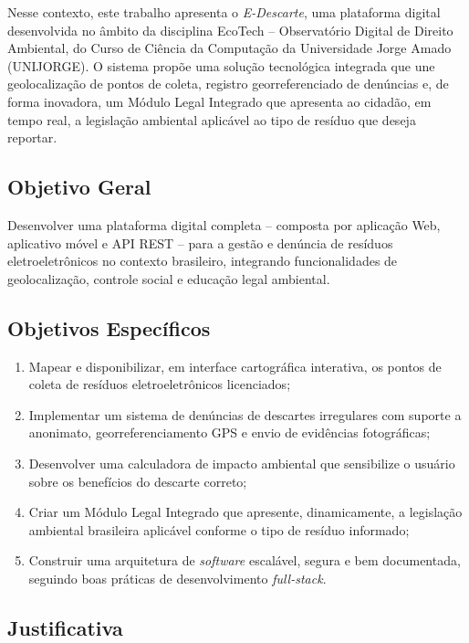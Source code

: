 \documentclass[12pt, a4paper]{article}
\numberwithin{equation}{section}
\numberwithin{figure}{section}
\numberwithin{table}{section}
\begin{document}
Nesse contexto, este trabalho apresenta o \textit{E-Descarte}, uma plataforma
digital desenvolvida no âmbito da disciplina EcoTech -- Observatório Digital de
Direito Ambiental, do Curso de Ciência da Computação da Universidade Jorge Amado
(UNIJORGE). O sistema propõe uma solução tecnológica integrada que une
geolocalização de pontos de coleta, registro georreferenciado de denúncias e,
de forma inovadora, um Módulo Legal Integrado que apresenta ao cidadão, em
tempo real, a legislação ambiental aplicável ao tipo de resíduo que deseja
reportar.

\subsection{Objetivo Geral}

Desenvolver uma plataforma digital completa -- composta por aplicação Web,
aplicativo móvel e API REST -- para a gestão e denúncia de resíduos
eletroeletrônicos no contexto brasileiro, integrando funcionalidades de
geolocalização, controle social e educação legal ambiental.

\subsection{Objetivos Específicos}

\begin{enumerate}
  \item Mapear e disponibilizar, em interface cartográfica interativa, os pontos
        de coleta de resíduos eletroeletrônicos licenciados;
  \item Implementar um sistema de denúncias de descartes irregulares com suporte
        a anonimato, georreferenciamento GPS e envio de evidências fotográficas;
  \item Desenvolver uma calculadora de impacto ambiental que sensibilize o
        usuário sobre os benefícios do descarte correto;
  \item Criar um Módulo Legal Integrado que apresente, dinamicamente, a
        legislação ambiental brasileira aplicável conforme o tipo de resíduo
        informado;
  \item Construir uma arquitetura de \textit{software} escalável, segura e bem
        documentada, seguindo boas práticas de desenvolvimento \textit{full-stack}.
\end{enumerate}

\subsection{Justificativa}
\end{document}
